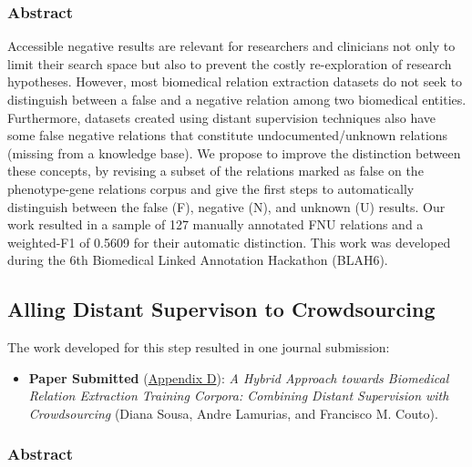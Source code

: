 \subsubsection{Abstract}

Accessible negative results are relevant for researchers and clinicians not only to limit their search space but also to prevent the costly re-exploration of research hypotheses. However, most biomedical relation extraction datasets do not seek to distinguish between a false and a negative relation among two biomedical entities. Furthermore, datasets created using distant supervision techniques also have some false negative relations that constitute undocumented/unknown relations (missing from a knowledge base). We propose to improve the distinction between these concepts, by revising a subset of the relations marked as false on the phenotype-gene relations corpus and give the first steps to automatically distinguish between the false (F), negative (N), and unknown (U) results. Our work resulted in a sample of 127 manually annotated FNU relations and a weighted-F1 of 0.5609 for their automatic distinction. This work was developed during the 6th Biomedical Linked Annotation Hackathon (BLAH6).


\subsection{Alling Distant Supervison to Crowdsourcing}

The work developed for this step resulted in one journal submission:

\begin{itemize}
    \item{\textbf{Paper Submitted} (\hyperlink{AD}{Appendix D}): \textit{A Hybrid Approach towards Biomedical Relation Extraction Training Corpora: Combining Distant Supervision with Crowdsourcing} (Diana Sousa, Andre Lamurias, and Francisco M. Couto).}
\end{itemize}

\subsubsection{Abstract}

